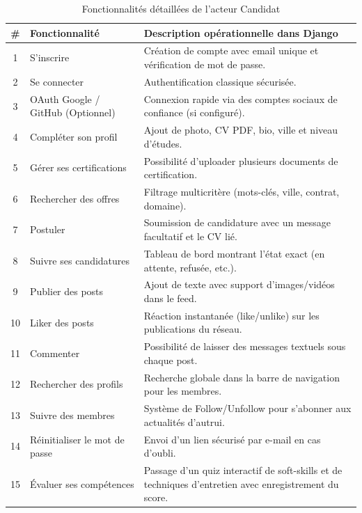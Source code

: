 \begin{table}[H]
\centering
\small
\begin{tabularx}{\textwidth}{c >{\raggedright\arraybackslash}p{4cm} >{\raggedright\arraybackslash}X}
\toprule
\textbf{\#} & \textbf{Fonctionnalité} & \textbf{Description opérationnelle dans Django} \\
\midrule
1 & S'inscrire & Création de compte avec email unique et vérification de mot de passe. \\
2 & Se connecter & Authentification classique sécurisée. \\
3 & OAuth Google / GitHub (Optionnel) & Connexion rapide via des comptes sociaux de confiance (si configuré). \\
4 & Compléter son profil & Ajout de photo, CV PDF, bio, ville et niveau d'études. \\
5 & Gérer ses certifications & Possibilité d'uploader plusieurs documents de certification. \\
6 & Rechercher des offres & Filtrage multicritère (mots-clés, ville, contrat, domaine). \\
7 & Postuler & Soumission de candidature avec un message facultatif et le CV lié. \\
8 & Suivre ses candidatures & Tableau de bord montrant l'état exact (en attente, refusée, etc.). \\
9 & Publier des posts & Ajout de texte avec support d'images/vidéos dans le feed. \\
10 & Liker des posts & Réaction instantanée (like/unlike) sur les publications du réseau. \\
11 & Commenter & Possibilité de laisser des messages textuels sous chaque post. \\
12 & Rechercher des profils & Recherche globale dans la barre de navigation pour les membres. \\
13 & Suivre des membres & Système de Follow/Unfollow pour s'abonner aux actualités d'autrui. \\
14 & Réinitialiser le mot de passe & Envoi d'un lien sécurisé par e-mail en cas d'oubli. \\
15 & Évaluer ses compétences & Passage d'un quiz interactif de soft-skills et de techniques d'entretien avec enregistrement du score. \\
\bottomrule
\end{tabularx}
\caption{Fonctionnalités détaillées de l'acteur Candidat}
\label{tab:features_candidat}
\end{table}

